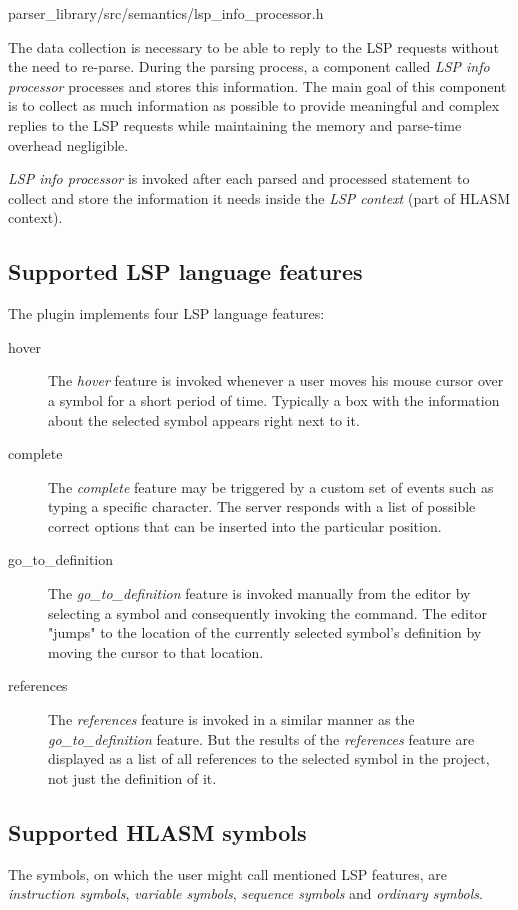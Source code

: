 {parser\_library/src/semantics/lsp\_info\_processor.h}
\label{lsp_data}

The data collection is necessary to be able to reply to the LSP requests without the need to re-parse. During the parsing process, a component called \emph{LSP info processor} processes and stores this information. The main goal of this component is to collect as much information as possible to provide meaningful and complex replies to the LSP requests while maintaining the memory and parse-time overhead negligible.

\emph{LSP info processor} is invoked after each parsed and processed statement to collect and store the information it needs inside the \emph{LSP context} (part of HLASM context). 

\subsection{Supported LSP language features}
The plugin implements four LSP language features:
\begin{description}
	\item[hover] The \emph{hover} feature is invoked whenever a user moves his mouse cursor over a symbol for a short period of time. Typically a box with the information about the selected symbol appears right next to it.
	\item[complete] The \emph{complete} feature may be triggered by a custom set of events such as typing a specific character. The server responds with a list of possible correct options that can be inserted into the particular position.
	\item[go\_to\_definition] The \emph{go\_to\_definition} feature is invoked manually from the editor by selecting a symbol and consequently invoking the  command. The editor "jumps" to the location of the currently selected symbol's definition by moving the cursor to that location.
	\item[references] The \emph{references} feature is invoked in a similar manner as the \emph{go\_to\_definition} feature. But the results of the \emph{references} feature are displayed as a list of all references to the selected symbol in the project, not just the definition of it. 
\end{description}

\subsection{Supported HLASM symbols}
The symbols, on which the user might call mentioned LSP features, are \emph{instruction symbols}, \emph{variable symbols}, \emph{sequence symbols} and \emph{ordinary symbols}.

